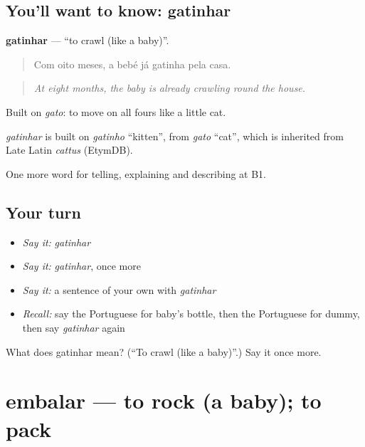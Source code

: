 \subsection*{You'll want to know: gatinhar}
\textbf{gatinhar} — \textquotedblleft{}to crawl (like a baby)\textquotedblright{}.

\begin{quote}
Com oito meses, a bebé já gatinha pela casa.
\end{quote}

\begin{quote}
\emph{At eight months, the baby is already crawling round the house.}
\end{quote}

Built on \emph{gato}: to move on all fours like a little cat.

\begin{cousinweb}
\emph{gatinhar} is built on \emph{gatinho} \textquotedblleft{}kitten\textquotedblright{}, from \emph{gato} \textquotedblleft{}cat\textquotedblright{}, which is inherited from Late Latin \emph{cattus} (EtymDB).
\end{cousinweb}

\begin{grammarlens}[title={What you've built}]
One more word for telling, explaining and describing at B1.
\end{grammarlens}

\subsection*{Your turn}
\begin{itemize}
\raggedright
  \item \emph{Say it:} \emph{gatinhar}
  \item \emph{Say it:} \emph{gatinhar}, once more
  \item \emph{Say it:} a sentence of your own with \emph{gatinhar}
  \item \emph{Recall:} say the Portuguese for baby's bottle, then the Portuguese for dummy, then say \emph{gatinhar} again
\end{itemize}

\begin{tcolorbox}[breakable,colback=teal!4,colframe=teal!35!black,title={Before you move on}]
What does gatinhar mean? (\textquotedblleft{}To crawl (like a baby)\textquotedblright{}.) Say it once more.
\end{tcolorbox}
\section[embalar]{embalar — to rock (a baby); to pack}

